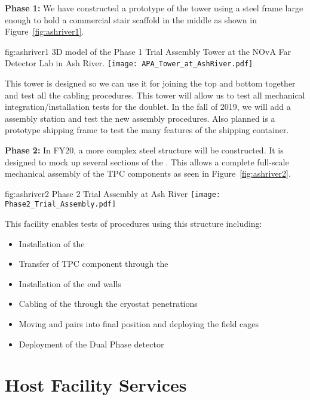 {\bf Phase 1:} We have constructed a prototype of the   tower
using a steel frame large enough to hold a commercial stair scaffold
in the middle as shown in Figure~\ref{fig:ashriver1}.
\begin{dunefigure}{fig:ashriver1}
  {3D model of the Phase 1 Trial Assembly  Tower at the NOvA Far Detector
    Lab in Ash River.}
  \texttt{[image: APA\_Tower\_at\_AshRiver.pdf]}
\end{dunefigure}
This  tower is designed so we can use it for joining the
top and bottom  together and test all the cabling
procedures.  This tower will allow us to test all mechanical
integration/installation tests for the  doublet. In the
fall of 2019, we will add a  assembly station and test the
new  assembly procedures.  Also planned is a prototype
 shipping frame to test the many features of the shipping
container.

{\bf Phase 2:} In FY20, a more complex steel structure will be
constructed. It is designed to mock up several sections of the
. This allows a complete full-scale mechanical assembly of
the TPC components as seen in Figure~\ref{fig:ashriver2}.
\begin{dunefigure}{fig:ashriver2}
  {Phase 2 Trial Assembly at Ash River}
  \texttt{[image: Phase2\_Trial\_Assembly.pdf]}
\end{dunefigure}
This facility enables tests of procedures using this structure including:
\begin{itemize}
 \item Installation of the 
 \item Transfer of TPC component through the 
 \item Installation of the end walls
 \item Cabling of the  through the cryostat penetrations
 \item Moving  and  pairs into final position and deploying the field cages
 \item Deployment of the Dual Phase detector
\end{itemize}

\section{ Host Facility Services}
\label{sec:fdsp-coord-host_facility_services}

